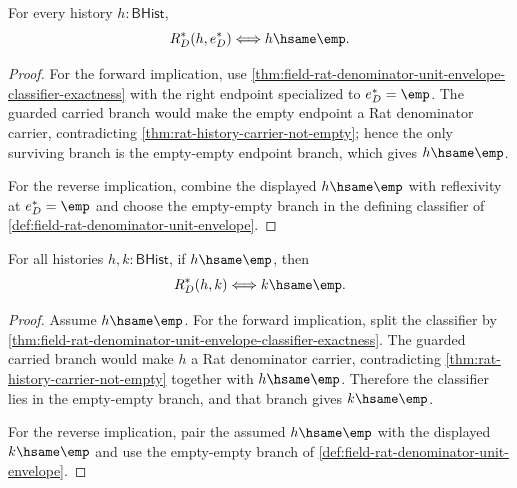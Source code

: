\begin{theorem}
\label{thm:field-rat-denominator-unit-envelope-empty-right-iff}
For every history $h:\mathsf{BHist}$,
$$
R_D^\ast(h,e_D^\ast)\Longleftrightarrow h\hsame\emp .
$$
\end{theorem}
\begin{proof}
For the forward implication, use
\autoref{thm:field-rat-denominator-unit-envelope-classifier-exactness} with
the right endpoint specialized to $e_D^\ast=\emp$. The guarded carried branch
would make the empty endpoint a Rat denominator carrier, contradicting
\autoref{thm:rat-history-carrier-not-empty}; hence the only surviving branch is
the empty-empty endpoint branch, which gives $h\hsame\emp$.

For the reverse implication, combine the displayed $h\hsame\emp$ with
reflexivity at $e_D^\ast=\emp$ and choose the empty-empty branch in the defining
classifier of \autoref{def:field-rat-denominator-unit-envelope}.
\end{proof}

\begin{theorem}
\label{thm:field-rat-denominator-unit-envelope-empty-left-iff}
For all histories $h,k:\mathsf{BHist}$, if $h\hsame\emp$, then
$$
R_D^\ast(h,k)\Longleftrightarrow k\hsame\emp .
$$
\end{theorem}
\begin{proof}
Assume $h\hsame\emp$. For the forward implication, split the classifier by
\autoref{thm:field-rat-denominator-unit-envelope-classifier-exactness}. The
guarded carried branch would make $h$ a Rat denominator carrier, contradicting
\autoref{thm:rat-history-carrier-not-empty} together with $h\hsame\emp$.
Therefore the classifier lies in the empty-empty branch, and that branch gives
$k\hsame\emp$.

For the reverse implication, pair the assumed $h\hsame\emp$ with the displayed
$k\hsame\emp$ and use the empty-empty branch of
\autoref{def:field-rat-denominator-unit-envelope}.
\end{proof}

